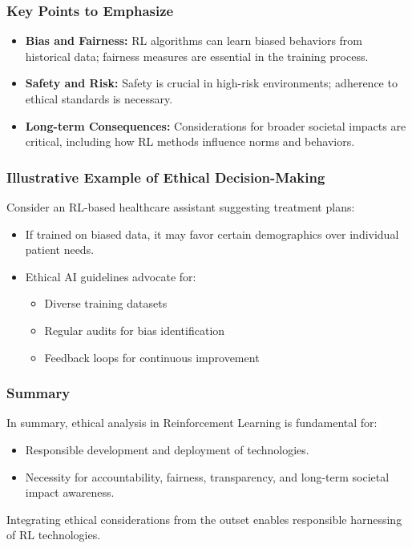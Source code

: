 \documentclass{beamer}
\begin{document}
\begin{frame}[fragile]
    \frametitle{Key Points to Emphasize}
    \begin{itemize}
        \item \textbf{Bias and Fairness:} RL algorithms can learn biased behaviors from historical data; fairness measures are essential in the training process.
        \item \textbf{Safety and Risk:} Safety is crucial in high-risk environments; adherence to ethical standards is necessary.
        \item \textbf{Long-term Consequences:} Considerations for broader societal impacts are critical, including how RL methods influence norms and behaviors.
    \end{itemize}
\end{frame}

\begin{frame}[fragile]
    \frametitle{Illustrative Example of Ethical Decision-Making}
    Consider an RL-based healthcare assistant suggesting treatment plans:
    \begin{itemize}
        \item If trained on biased data, it may favor certain demographics over individual patient needs.
        \item Ethical AI guidelines advocate for:
        \begin{itemize}
            \item Diverse training datasets
            \item Regular audits for bias identification
            \item Feedback loops for continuous improvement
        \end{itemize}
    \end{itemize}
\end{frame}

\begin{frame}[fragile]
    \frametitle{Summary}
    In summary, ethical analysis in Reinforcement Learning is fundamental for:
    \begin{itemize}
        \item Responsible development and deployment of technologies.
        \item Necessity for accountability, fairness, transparency, and long-term societal impact awareness.
    \end{itemize}
    Integrating ethical considerations from the outset enables responsible harnessing of RL technologies.
\end{frame}
\end{document}
